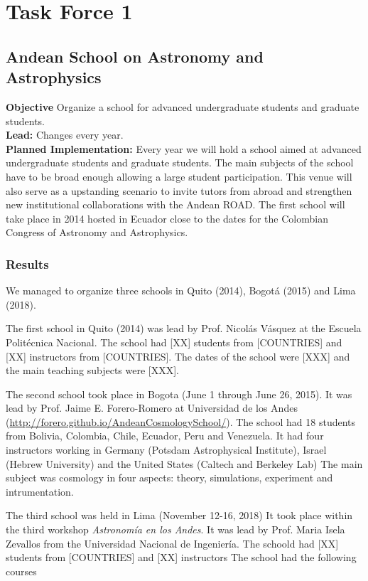 \section{Task Force 1}
\label{chapter2}
\textit{}


\subsection{Andean School on Astronomy and Astrophysics}
\textbf{Objective} Organize a school for advanced undergraduate
students and graduate students.  
\\
\textbf{Lead:} Changes every year. 
\\
\textbf{Planned Implementation:} 
Every year we will hold a school aimed at advanced undergraduate
students and graduate students.  
The main subjects of the school have to be broad enough allowing a
large student participation.  
This venue will also serve as a upstanding scenario to invite tutors
from abroad and strengthen new institutional collaborations with the
Andean ROAD.  
The first school will take place in 2014 hosted in Ecuador close to
the dates for the Colombian Congress of Astronomy and Astrophysics. 

\subsubsection{Results}

We managed to organize three schools in Quito (2014), Bogot\'a (2015)
and Lima (2018).  

The first school in Quito (2014) was lead by Prof. Nicol\'as V\'asquez
at the Escuela Polit\'ecnica Nacional.  
The school had [XX] students from [COUNTRIES] and [XX] instructors
from [COUNTRIES].  
The dates of the school were [XXX] and the main teaching subjects were [XXX].

The second school took place in Bogota (June 1 through June 26, 2015). 
It was lead by Prof. Jaime E. Forero-Romero at Universidad de los
Andes (\url{http://forero.github.io/AndeanCosmologySchool/}). 
The school had 18  students from Bolivia, Colombia, Chile, Ecuador,
Peru and Venezuela.
It had four instructors working in Germany (Potsdam Astrophysical Institute), 
Israel (Hebrew University) and the United States (Caltech and Berkeley Lab)
The main subject was cosmology in four aspects: theory, simulations,
experiment and intrumentation. 

The third school was held in Lima (November 12-16, 2018) 
It took place within the third workshop \emph{Astronom\'ia en los Andes}. 
It was lead by Prof. Maria Isela Zevallos from the Universidad
Nacional de Ingenier\'ia. The schoold had [XX] students from
[COUNTRIES] and [XX] instructors   
The school had the following courses

